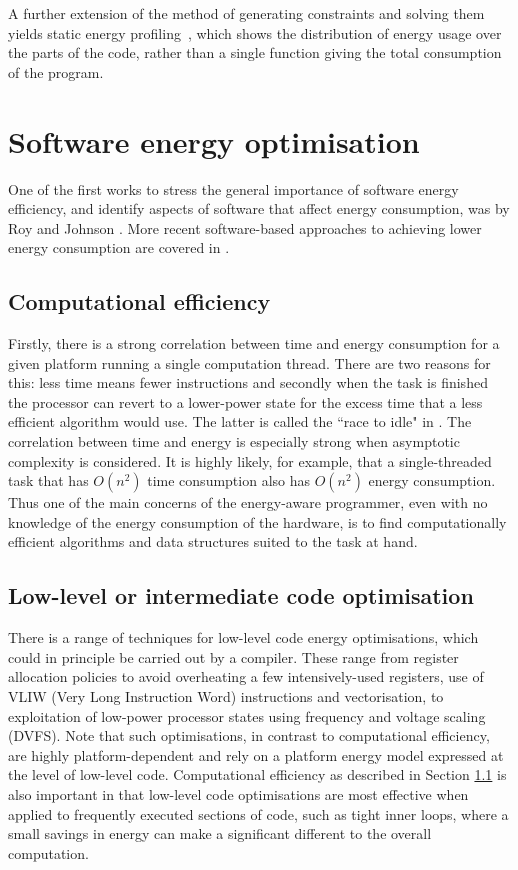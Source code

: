 \documentclass[oneside]{book}
\begin{document}
A further extension of the method of generating constraints and solving them yields
static energy profiling~\cite{staticprofiling-flops}, which shows the
distribution of energy usage over the parts of the code, rather than a single function giving the total consumption of the program.
 
\nopagebreak
\section{Software energy optimisation}
\label{inefficiency}
 
 
One of the first works to stress the general importance of software energy efficiency, and identify  aspects of software that affect energy consumption, was by Roy and Johnson \cite{Roy_Johnson_1997}. More recent software-based approaches to achieving lower energy consumption are covered in \cite{Larsson2011,Steigerwald_Agrawal_2011}. 



\subsection{Computational efficiency}\label{compeff}
Firstly, there is a strong correlation between time and energy consumption for a given platform running a single computation thread. There are two reasons for this: less time means fewer instructions and secondly when the task is finished the processor can revert to a lower-power state for the excess time that a less efficient algorithm would use. The latter is called the ``race to idle" in \cite{Steigerwald_Agrawal_2011}. The correlation between time and energy is especially strong when asymptotic complexity is considered.  It is highly likely, for example, that a single-threaded task that has $O(n^2)$ time consumption also has $O(n^2)$ energy consumption.  Thus one of the main concerns of the energy-aware programmer, even with no knowledge of the energy consumption of the hardware, is to find computationally efficient algorithms and data structures suited to the task at hand.

\subsection{Low-level or intermediate code optimisation}
There is a range of techniques for low-level code energy optimisations, which could in principle be carried out by a compiler.  These range from register allocation policies to avoid overheating a few intensively-used registers, use of VLIW (Very Long Instruction Word) instructions and vectorisation, to exploitation of low-power processor states using frequency and voltage scaling (DVFS).  Note that such optimisations, in contrast to computational efficiency, are highly platform-dependent and rely on a platform energy model expressed at the level of low-level code.  Computational efficiency as described in Section \ref{compeff} is also important  in that low-level code optimisations are most effective when applied to frequently executed sections of code, such as tight inner loops, where a small savings in energy can make a significant different to the overall computation. 
\end{document}

